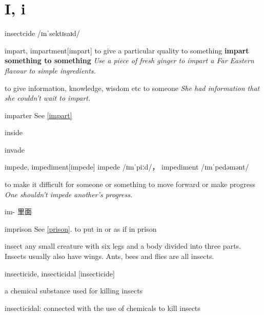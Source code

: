 \section{I, i}

\begin{word}{insectcide}
    /ɪnˈsektɪsaɪd/
\end{word}

\begin{word}{impart, impartment}[impart]
    to give a particular quality to something
    \textbf{impart something to something}
    \textit{Use a piece of fresh ginger to impart a Far Eastern flavour to simple ingredients.}

    to give information, knowledge, wisdom etc to someone
    \textit{She had information that she couldn’t wait to impart.}
\end{word}

\begin{word}{imparter}
    See \ref{impart}
\end{word}

\begin{word}{inside}
\end{word}

\begin{word}{invade}
\end{word}

\begin{word}{impede, impediment}[impede]
    impede /ɪmˈpiːd/， impediment /ɪmˈpedəmənt/ 

    to make it difficult for someone or something to move forward or make progress
    \textit{One shouldn't impede another's progress.}

    im- 里面
\end{word}

\begin{word}{imprison}
    See \ref{prison}.
    to put in or as if in prison
\end{word}

\begin{word}{insect}
    any small creature with six legs and a body divided into three parts. Insects usually also have wings. Ants, bees and flies are all insects.
\end{word}

\begin{word}{insecticide,  insecticidal }[insecticide]

    a chemical substance used for killing insects

    insecticidal: connected with the use of chemicals to kill insects 
\end{word}

